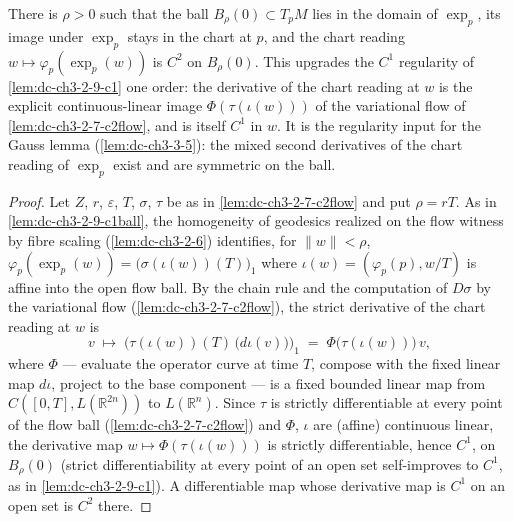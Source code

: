 \begin{lemma}
  \label{lem:dc-ch3-2-9-c2ball}


  There is $\rho > 0$ such that the ball $B_\rho(0) \subset T_pM$ lies in the
  domain of $\exp_p$, its image under $\exp_p$ stays in the chart at $p$, and
  the chart reading $w \mapsto \varphi_p(\exp_p(w))$ is $C^2$ on $B_\rho(0)$.
  This upgrades the $C^1$ regularity of \cref{lem:dc-ch3-2-9-c1} one order:
  the derivative of the chart reading at $w$ is the explicit
  continuous-linear image $\Phi(\tau(\iota(w)))$ of the variational flow of
  \cref{lem:dc-ch3-2-7-c2flow}, and is itself $C^1$ in $w$. It is the
  regularity input for the Gauss lemma (\cref{lem:dc-ch3-3-5}): the mixed
  second derivatives of the chart reading of $\exp_p$ exist and are symmetric
  on the ball.
\end{lemma}
\begin{proof}
  \sketch

  Let $Z$, $r$, $\varepsilon$, $T$, $\sigma$, $\tau$ be as in
  \cref{lem:dc-ch3-2-7-c2flow} and put $\rho = rT$. As in
  \cref{lem:dc-ch3-2-9-c1ball}, the homogeneity of geodesics realized on the
  flow witness by fibre scaling (\cref{lem:dc-ch3-2-6}) identifies, for
  $\|w\| < \rho$,
  $\varphi_p(\exp_p(w)) = \big(\sigma(\iota(w))(T)\big)_1$ where
  $\iota(w) = (\varphi_p(p), w/T)$ is affine into the open flow ball. By the
  chain rule and the computation of $D\sigma$ by the variational flow
  (\cref{lem:dc-ch3-2-7-c2flow}), the strict derivative of the chart reading
  at $w$ is
  $$
  v \;\longmapsto\; \Big(\tau(\iota(w))(T)\,\big(d\iota(v)\big)\Big)_1
  \;=\; \Phi\big(\tau(\iota(w))\big)\,v,
  $$
  where $\Phi$ — evaluate the operator curve at time $T$, compose with the
  fixed linear map $d\iota$, project to the base component — is a fixed
  bounded linear map from $C([0,T], L(\mathbb{R}^{2n}))$ to
  $L(\mathbb{R}^n)$. Since $\tau$ is strictly differentiable at every point
  of the flow ball (\cref{lem:dc-ch3-2-7-c2flow}) and $\Phi$, $\iota$ are
  (affine) continuous linear, the derivative map
  $w \mapsto \Phi(\tau(\iota(w)))$ is strictly differentiable, hence $C^1$,
  on $B_\rho(0)$ (strict differentiability at every point of an open set
  self-improves to $C^1$, as in \cref{lem:dc-ch3-2-9-c1}). A differentiable
  map whose derivative map is $C^1$ on an open set is $C^2$ there.
\end{proof}

